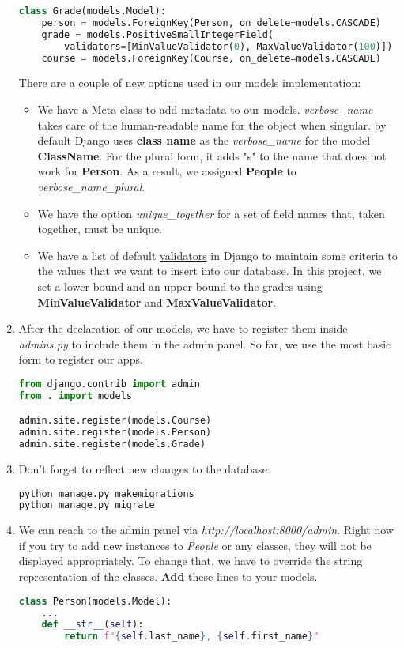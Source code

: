 \documentclass{homework}
\begin{document}
\begin{enumerate}[label=\roman*)]
\begin{lstlisting}[language=python]
class Grade(models.Model):
    person = models.ForeignKey(Person, on_delete=models.CASCADE)
    grade = models.PositiveSmallIntegerField(
        validators=[MinValueValidator(0), MaxValueValidator(100)])
    course = models.ForeignKey(Course, on_delete=models.CASCADE)
\end{lstlisting}
    There are a couple of new options used in our models implementation:
    \begin{itemize}
        \item We have a \href{https://docs.djangoproject.com/en/4.1/ref/models/options/}{Meta class} to add metadata to our models. \textit{verbose\_name} takes care of the human-readable name for the object when singular. by default Django uses \textbf{class name} as the \textit{verbose\_name} for the model \textbf{ClassName}. For the plural form, it adds "s" to the name that does not work for \textbf{Person}. As a result, we assigned \textbf{People} to \textit{verbose\_name\_plural}.
        \item We have the option \textit{unique\_together} for a set of field names that, taken together, must be unique.
        \item We have a list of default \href{https://docs.djangoproject.com/en/4.1/ref/validators/}{validators} in Django to maintain some criteria to the values that we want to insert into our database. In this project, we set a lower bound and an upper bound to the grades using \textbf{MinValueValidator} and \textbf{MaxValueValidator}. 
    \end{itemize}
    \item After the declaration of our models, we have to register them inside \textit{admins.py} to include them in the admin panel. So far, we use the most basic form to register our apps.
    \begin{lstlisting}[language=python]
from django.contrib import admin
from . import models

admin.site.register(models.Course)
admin.site.register(models.Person)
admin.site.register(models.Grade)
\end{lstlisting}

    \item Don't forget to reflect new changes to the database:
    \begin{lstlisting}[language=bash]
python manage.py makemigrations
python manage.py migrate
\end{lstlisting}
    \item We can reach to the admin panel via \textit{http://localhost:8000/admin}. Right now if you try to add new instances to \textit{People} or any classes, they will not be displayed appropriately. To change that, we have to override the string representation of the classes. \textbf{Add} these lines to your models.
    \\
    \begin{lstlisting}[language=python]
class Person(models.Model):
    ...
    def __str__(self):
        return f"{self.last_name}, {self.first_name}"


\end{lstlisting}
\end{enumerate}
\end{document}
